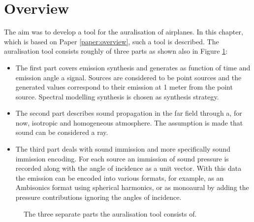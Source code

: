 \section{Overview}

The aim was to develop a tool for the auralisation of airplanes. In this
chapter, which is based on Paper \ref{paper:overview}, such a tool is described.
The auralisation tool consists roughly of three parts as shown also in Figure
\ref{fig:implementation:overview}:

\begin{itemize}
\item The first part covers emission synthesis and generates as function of time and
emission angle a signal. Sources are considered to be point sources and the
generated values correspond to their emission at 1 meter from the point source.
Spectral modelling synthesis is chosen as synthesis strategy.

\item The second part describes sound propagation in the far field through a,
for now, isotropic and homogeneous atmosphere. The assumption is made that sound
can be considered a ray.

\item The third part deals with sound immission and more specifically sound immission
encoding. For each source an immission of sound pressure is recorded along with
the angle of incidence as a unit vector. With this data the emission can be
encoded into various formats, for example, as an Ambisonics format using
spherical harmonics, or as monoaural by adding the pressure contributions
ignoring the angles of incidence.
\end{itemize}

\begin{figure}[H]
  \centering
{}
  \caption{The three separate parts the auralisation tool consists of.}
  \label{fig:implementation:overview}
\end{figure}

